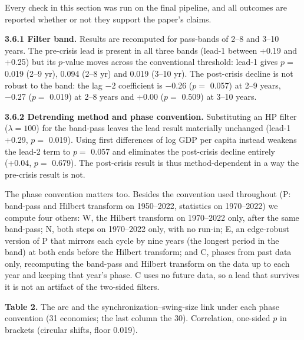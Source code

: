 \documentclass[11pt,a4paper]{article}
\begin{document}
Every check in this section was run on the final pipeline, and all outcomes are reported whether or not they support the paper's claims.

\textbf{3.6.1 Filter band.} Results are recomputed for pass-bands of 2–8 and 3–10 years. The pre-crisis lead is present in all three bands (lead-1 between +0.19 and +0.25) but its \(p\)-value moves across the conventional threshold: lead-1 gives \(p =\) 0.019 (2–9 yr), 0.094 (2–8 yr) and 0.019 (3–10 yr). The post-crisis decline is not robust to the band: the lag \(-2\) coefficient is −0.26 (\(p =\) 0.057) at 2–9 years, −0.27 (\(p =\) 0.019) at 2–8 years and +0.00 (\(p =\) 0.509) at 3–10 years.

\textbf{3.6.2 Detrending method and phase convention.} Substituting an HP filter (\(\lambda = 100\)) for the band-pass leaves the lead result materially unchanged (lead-1 +0.29, \(p =\) 0.019). Using first differences of log GDP per capita instead weakens the lead-2 term to \(p =\) 0.057 and eliminates the post-crisis decline entirely (+0.04, \(p =\) 0.679). The post-crisis result is thus method-dependent in a way the pre-crisis result is not.

The phase convention matters too. Besides the convention used throughout (P: band-pass and Hilbert transform on 1950–2022, statistics on 1970–2022) we compute four others: W, the Hilbert transform on 1970–2022 only, after the same band-pass; N, both steps on 1970–2022 only, with no run-in; E, an edge-robust version of P that mirrors each cycle by nine years (the longest period in the band) at both ends before the Hilbert transform; and C, phases from past data only, recomputing the band-pass and Hilbert transform on the data up to each year and keeping that year's phase. C uses no future data, so a lead that survives it is not an artifact of the two-sided filters.

\textbf{Table 2.} The arc and the synchronization–swing-size link under each phase convention (31 economies; the last column the 30). Correlation, one-sided \(p\) in brackets (circular shifts, floor 0.019).
\end{document}

